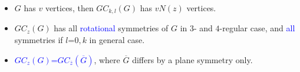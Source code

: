 \documentclass{beamer}
\begin{document}
\begin{frame}
\begin{itemize}
\item  $G$ has $v$ vertices, then $GC_{k,l}(G)$ has
$vN(z)$ vertices.
\item 
$GC_{z}(G)$ has all \textcolor{blue}{rotational} symmetries of 
$G$ in $3$- and $4$-regular case, and \textcolor{blue}{all} 
symmetries 
if $l$=$0,k$ in general case.
\item \textcolor{blue}{$GC_{z}(G)$=$GC_{\overline{z}}(\overline{G})$}, where $\overline{G}$ 
differs by a plane symmetry only. 


\end{itemize}
\end{frame} 


\end{document}
